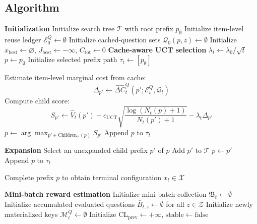 \documentclass{article}
\begin{document}
\subsection{Algorithm}
\newpage
\begin{algorithm}[t]
\caption{Sampling-Based Agent-UCT with Item-Level Prefix Reuse}
\label{alg:reuse-regularized-uct}
\begin{algorithmic}[1]
\Statex \textbf{Initialization}
\State Initialize search tree \(\mathcal T\) with root prefix \(p_{\emptyset}\)
\State Initialize item-level reuse ledger \(\mathcal E_0^Q\leftarrow\emptyset\)
\State Initialize cached-question sets \(\mathcal Q_0(p,z)\leftarrow\emptyset\)
\State Initialize \(x_{\mathrm{best}}\leftarrow\varnothing\), \(J_{\mathrm{best}}\leftarrow-\infty\), \(C_{\mathrm{tot}}\leftarrow0\)
\newline
\Statex \textbf{Cache-aware UCT selection}
    \State \(\lambda_t\leftarrow\lambda_0/\sqrt t\)
    \State \(p\leftarrow p_{\emptyset}\)
    \State Initialize selected prefix path \(\tau_t\leftarrow[p_{\emptyset}]\)


            \State Estimate item-level marginal cost from cache:
            \[
            \Delta_{p'}
            \leftarrow
            \widehat{\Delta C}^{Q}_t(p';\mathcal E_t^Q,\mathcal Q_t)
            \]
            \State Compute child score:
            \[
            S_{p'}
            \leftarrow
            \hat V_t(p')
            +
            c_{\mathrm{UCT}}
            \sqrt{
            \frac{\log(N_t(p)+1)}
            {N_t(p')+1}
            }
            -
            \lambda_t\Delta_{p'}
            \]
        \EndFor
        \State \(p\leftarrow\arg\max_{p'\in\mathrm{Children}_{\mathcal T}(p)} S_{p'}\)
        \State Append \(p\) to \(\tau_t\)
    \EndWhile

\Statex \textbf{Expansion}
        \State Select an unexpanded child prefix \(p'\) of \(p\)
        \State Add \(p'\) to \(\mathcal T\)
        \State \(p\leftarrow p'\)
        \State Append \(p\) to \(\tau_t\)
    \EndIf

    \State Complete prefix \(p\)  to obtain terminal configuration \(x_t\in\mathcal X\)

\Statex \textbf{Mini-batch reward estimation}
    \State Initialize mini-batch collection \(\mathfrak B_t\leftarrow\emptyset\)
    \State Initialize accumulated evaluated questions \(\bar B_{t,z}\leftarrow\emptyset\) for all \(z\in\mathcal Z\)
    \State Initialize newly materialized keys \(\mathcal M_t^Q\leftarrow\emptyset\)
    \State Initialize \(\mathrm{CL}_{\mathrm{prev}}\leftarrow+\infty\), \(\mathrm{stable}\leftarrow\mathrm{false}\)


\end{algorithmic}
\end{algorithm}
\end{document}
